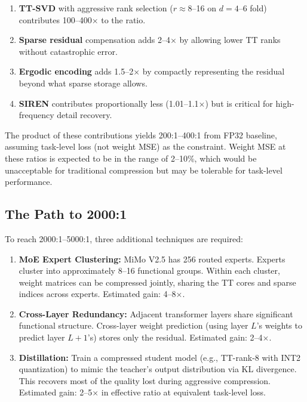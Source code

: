 \documentclass[11pt,a4paper]{article}
\begin{document}
\begin{enumerate}
	\item \textbf{TT-SVD} with aggressive rank selection ($r \approx 8$--16 on
	      $d=4$--6 fold) contributes 100--400$\times$ to the ratio.
	\item \textbf{Sparse residual} compensation adds 2--4$\times$ by allowing
	      lower TT ranks without catastrophic error.
	\item \textbf{Ergodic encoding} adds 1.5--2$\times$ by compactly representing
	      the residual beyond what sparse storage allows.
	\item \textbf{SIREN} contributes proportionally less (1.01--1.1$\times$) but
	      is critical for high-frequency detail recovery.
\end{enumerate}

The product of these contributions yields 200:1--400:1 from FP32 baseline,
assuming task-level loss (not weight MSE) as the constraint. Weight MSE at
these ratios is expected to be in the range of 2--10\%, which would be
unacceptable for traditional compression but may be tolerable for task-level
performance.

\subsection{The Path to 2000:1}

To reach 2000:1--5000:1, three additional techniques are required:

\begin{enumerate}
	\item \textbf{MoE Expert Clustering:} MiMo V2.5 has 256 routed experts.
	      Experts cluster into approximately 8--16 functional groups. Within
	      each cluster, weight matrices can be compressed jointly, sharing the
	      TT cores and sparse indices across experts. Estimated gain: 4--8$\times$.
	\item \textbf{Cross-Layer Redundancy:} Adjacent transformer layers share
	      significant functional structure. Cross-layer weight prediction
	      (using layer $L$'s weights to predict layer $L+1$'s) stores only the
	      residual. Estimated gain: 2--4$\times$.
	\item \textbf{Distillation:} Train a compressed student model (e.g.,
	      TT-rank-8 with INT2 quantization) to mimic the teacher's output
	      distribution via KL divergence. This recovers most of the quality
	      lost during aggressive compression. Estimated gain: 2--5$\times$
	      in effective ratio at equivalent task-level loss.
\end{enumerate}
\end{document}
